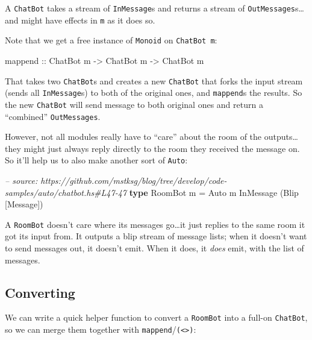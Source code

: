 \documentclass[]{article}
\newenvironment{Shaded}{}{}
\newcommand{\KeywordTok}[1]{\textcolor[rgb]{0.00,0.44,0.13}{\textbf{{#1}}}}
\newcommand{\DataTypeTok}[1]{\textcolor[rgb]{0.56,0.13,0.00}{{#1}}}
\newcommand{\CommentTok}[1]{\textcolor[rgb]{0.38,0.63,0.69}{\textit{{#1}}}}
\newcommand{\OtherTok}[1]{\textcolor[rgb]{0.00,0.44,0.13}{{#1}}}
\newcommand{\FunctionTok}[1]{\textcolor[rgb]{0.02,0.16,0.49}{{#1}}}
\newcommand{\NormalTok}[1]{{#1}}
\begin{document}
A \texttt{ChatBot} takes a stream of \texttt{InMessage}s and returns a stream of
\texttt{OutMessages}s\ldots{}and might have effects in \texttt{m} as it does so.

Note that we get a free instance of \texttt{Monoid} on \texttt{ChatBot\ m}:

\begin{Shaded}
\begin{Highlighting}[]
\NormalTok{mappend}\OtherTok{ ::} \DataTypeTok{ChatBot} \NormalTok{m }\OtherTok{->} \DataTypeTok{ChatBot} \NormalTok{m }\OtherTok{->} \DataTypeTok{ChatBot} \NormalTok{m}
\end{Highlighting}
\end{Shaded}

That takes two \texttt{ChatBot}s and creates a new \texttt{ChatBot} that forks
the input stream (sends all \texttt{InMessage}s) to both of the original ones,
and \texttt{mappend}s the results. So the new \texttt{ChatBot} will send message
to both original ones and return a ``combined'' \texttt{OutMessages}.

However, not all modules really have to ``care'' about the room of the
outputs\ldots{}they might just always reply directly to the room they received
the message on. So it'll help us to also make another sort of \texttt{Auto}:

\begin{Shaded}
\begin{Highlighting}[]
\CommentTok{-- source: https://github.com/mstksg/blog/tree/develop/code-samples/auto/chatbot.hs#L47-47}
\KeywordTok{type} \DataTypeTok{RoomBot} \NormalTok{m }\FunctionTok{=} \DataTypeTok{Auto} \NormalTok{m }\DataTypeTok{InMessage} \NormalTok{(}\DataTypeTok{Blip} \NormalTok{[}\DataTypeTok{Message}\NormalTok{])}
\end{Highlighting}
\end{Shaded}

A \texttt{RoomBot} doesn't care where its messages go\ldots{}it just replies to
the same room it got its input from. It outputs a blip stream of message lists;
when it doesn't want to send messages out, it doesn't emit. When it does, it
\emph{does} emit, with the list of messages.

\subsection{Converting}\label{converting}

We can write a quick helper function to convert a \texttt{RoomBot} into a
full-on \texttt{ChatBot}, so we can merge them together with
\texttt{mappend}/\texttt{(\textless{}\textgreater{})}:
\end{document}
